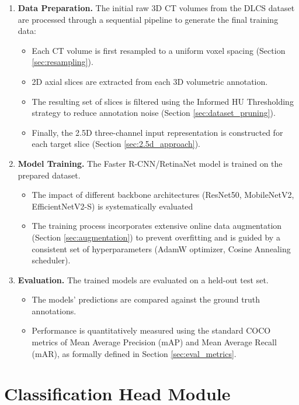 \begin{enumerate}
    \item \textbf{Data Preparation.} The initial raw 3D CT volumes from the DLCS dataset are processed through a sequential pipeline to generate the final training data:
    \begin{itemize}
        \item Each CT volume is first resampled to a uniform voxel spacing (Section \ref{sec:resampling}).
        \item 2D axial slices are extracted from each 3D volumetric annotation.
        \item The resulting set of slices is filtered using the Informed HU Thresholding strategy to reduce annotation noise (Section \ref{sec:dataset_pruning}).
        \item Finally, the 2.5D three-channel input representation is constructed for each target slice (Section \ref{sec:2.5d_approach}).
    \end{itemize}

    \item \textbf{Model Training.} The Faster R-CNN/RetinaNet model is trained on the prepared dataset. 
    \begin{itemize}
        \item The impact of different backbone architectures (ResNet50, MobileNetV2, EfficientNetV2-S) is systematically evaluated
        \item The training process incorporates extensive online data augmentation (Section \ref{sec:augmentation}) to prevent overfitting and is guided by a consistent set of hyperparameters (AdamW optimizer, Cosine Annealing scheduler).
    \end{itemize}

    \item \textbf{Evaluation.} The trained models are evaluated on a held-out test set. 
    \begin{itemize}
        \item The models' predictions are compared against the ground truth annotations.
        \item Performance is quantitatively measured using the standard COCO metrics of Mean Average Precision (mAP) and Mean Average Recall (mAR), as formally defined in Section \ref{sec:eval_metrics}.
    \end{itemize}
\end{enumerate}


\section{Classification Head Module}

